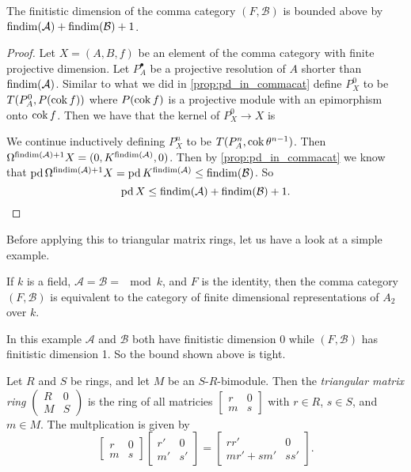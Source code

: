 \begin{theorem}\cite[Theorem~4.20]{FGR75}\label{thm:findim_of_comma_cat}
	The finitistic dimension of the comma category $(F, \mathcal B)$ is bounded above by $\operatorname{findim}(\mathcal A) + \operatorname{findim}(\mathcal B) + 1$.
	\begin{proof}
		Let $X=(A, B, f)$ be an element of the comma category with finite projective dimension. Let $P_A^\bullet$ be a projective resolution of $A$ shorter than $\operatorname{findim}(\mathcal A)$. Similar to what we did in \cref{prop:pd_in_commacat} define $P_X^0$ to be $T(P_A^0, P(\operatorname{cok} f))$ where $P(\operatorname{cok} f)$ is a projective module with an epimorphism onto $\operatorname{cok} f$. Then we have that the kernel of $P_X^0 \to X$ is 
		We continue inductively defining $P_X^n$ to be $T(P_A^n, \operatorname{cok} \theta^{n-1})$. Then $\Omega^{\operatorname{findim}(\mathcal A)+1} X = (0, K^{\operatorname{findim}(\mathcal A)}, 0)$. Then by \cref{prop:pd_in_commacat} we know that $\operatorname{pd}\Omega^{\operatorname{findim}(\mathcal A)+1}X = \operatorname{pd} K^{\operatorname{findim}(\mathcal A)} \leq \operatorname{findim}(\mathcal B)$. So $$\operatorname{pd} X \leq \operatorname{findim}(\mathcal A) + \operatorname{findim}(\mathcal B) + 1.$$
	\end{proof}
\end{theorem}

Before applying this to triangular matrix rings, let us have a look at a simple example.

\begin{example}\label{ex:triangular_matrix_ring}
	If $k$ is a field, $\mathcal A = \mathcal B = \mod k$, and $F$ is the identity, then the comma category $(F, \mathcal B)$ is equivalent to the category of finite dimensional representations of $A_2$ over $k$. 
\end{example}

In this example $\mathcal A$ and $\mathcal B$ both have finitistic dimension 0 while $(F, \mathcal B)$ has finitistic dimension 1. So the bound shown above is tight. 

\begin{defn}
	Let $R$ and $S$ be rings, and let $M$ be an $S$-$R$-bimodule. Then the \emph{triangular matrix ring} $\begin{pmatrix}
	R & 0\\
	M & S
	\end{pmatrix}$ is the ring of all matricies $\begin{bmatrix}
	r & 0\\
	m & s
	\end{bmatrix}$ with $r\in R$, $s\in S$, and $m\in M$. The multplication is given by
	$$\begin{bmatrix}
	r & 0\\
	m & s
	\end{bmatrix}\begin{bmatrix}
	r' & 0\\
	m' & s'
	\end{bmatrix}=\begin{bmatrix}
	rr' & 0\\
	mr' + sm' & ss'
	\end{bmatrix}.$$
\end{defn}

